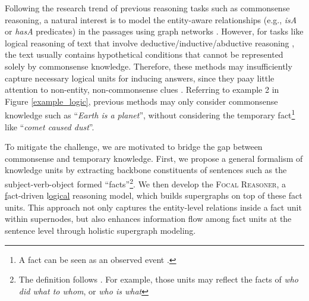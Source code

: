 \documentclass[11pt]{article}
\begin{document}
Following the research trend of previous reasoning tasks such as commonsense reasoning, a natural interest is to model the entity-aware relationships (e.g., \textit{isA} or \textit{hasA} predicates) in the passages using graph networks  \citep{yasunaga2021qagnn,ren2020beta,zhang2021video,krishna2020local,lv2020graph}. However, for tasks like logical reasoning of text that involve deductive/inductive/abductive reasoning \cite{reichertz20044}, the text usually contains hypothetical conditions that cannot be represented solely by commonsense knowledge. Therefore, these methods may insufficiently capture necessary logical units for inducing answers, since they paay little attention to non-entity, non-commonsense clues \citep{2021arXiv210406598Z}. Referring to example 2 in Figure \ref{example_logic}, previous methods may only consider commonsense knowledge such as ``\textit{Earth is a planet}'', without considering the temporary fact\footnote{A fact can be seen as an observed event \cite{peterson1997fact}.} like ``\textit{comet caused dust}''.


To mitigate the challenge, we are motivated to bridge the gap between commonsense and temporary knowledge. First, we propose a general formalism of knowledge units by extracting backbone constituents of sentences such as the subject-verb-object formed ``facts''\footnote{The definition follows \citet{nakashole2014language}. For example, those units may reflect the facts of \textit{who did what to whom}, or \textit{who is what}}. We then develop the \textsc{Focal Reasoner}, a \underline{f}act-driven l\underline{o}gi\underline{cal} reasoning model, which builds supergraphs on top of these fact units. This approach not only captures the entity-level relations inside a fact unit within supernodes, but also enhances information flow among fact units at the sentence level through holistic supergraph modeling.
\end{document}
